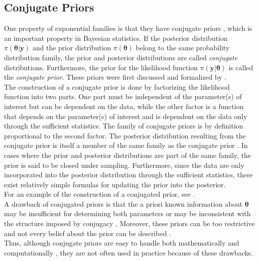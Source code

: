 \subsection{Conjugate Priors}
One property of exponential families is that they have conjugate priors \autocite[][]{diaconis1979conjugate}, which is an important property in Bayesian statistics. If the posterior distribution $\pi\left(\pmb{\theta}|\pmb{y}\right)$ and the prior distribution $\pi\left(\pmb{\theta}\right)$ belong to the same probability distribution family, the prior and posterior distributions are called \textit{conjugate} distributions. Furthermore, the prior for the likelihood function $\pi\left(\pmb{y}|\pmb{\theta}\right)$ is called the \textit{conjugate prior}. These priors were first discussed and formalized by \cite{raiffaapplied}. \\
The construction of a conjugate prior is done by factorizing the likelihood function into two parts. One part must be independent of the parameter(s) of interest but can be dependent on the data, while the other factor is a function that depends on the parameter(s) of interest and is dependent on the data only through the sufficient statistics. The family of conjugate priors is by definition proportional to the second factor. The posterior distribution resulting from the conjugate prior is itself a member of the same family as the conjugate prior \autocite[][]{raiffaapplied}. In cases where the prior and posterior distributions are part of the same family, the prior is said to be closed under sampling. Furthermore, since the data are only incorporated into the posterior distribution through the sufficient statistics, there exist relatively simple formulas for updating the prior into the posterior.\\
For an example of the construction of a conjugated prior, see \cite{fink1997compendium}.\\
A drawback of conjugated priors is that the a priori known information about $\pmb{\theta}$ may be insufficient for determining both parameters or may be inconsistent with the structure imposed by conjugacy \autocite[][]{robert2010bayesian}. Moreover, these priors can be too restrictive and not every belief about the prior can be described \autocite[][]{irwin2005prior}. \\
Thus, although conjugate priors are easy to handle both mathematically and computationally \autocite[][]{irwin2005prior}, they are not often used in practice because of these drawbacks.
